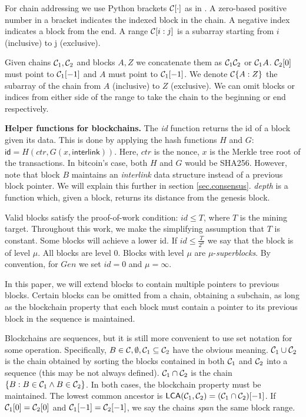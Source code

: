 For chain addressing we use Python brackets $\mathcal{C}[\cdot]$ as in
\cite{fruitchains}. A zero-based positive number in a bracket indicates the
indexed block in the chain. A negative index indicates a block from the end. A
range $\mathcal{C}[i:j]$ is a subarray starting from $i$ (inclusive) to j
(exclusive).

Given chains $\mathcal{C}_1, \mathcal{C}_2$ and blocks $A, Z$ we concatenate them as
$\mathcal{C}_1 \mathcal{C}_2$ or $\mathcal{C}_1 A$. $\mathcal{C}_2[0]$ must point to $\mathcal{C}_1[-1]$
and $A$ must point to $\mathcal{C}_1[-1]$. We denote $\mathcal{C}\{A:Z\}$ the subarray of
the chain from $A$ (inclusive) to $Z$ (exclusive). We can omit blocks or indices
from either side of the range to take the chain to the beginning or end
respectively.

\textbf{Helper functions for blockchains.} The \textit{id} function returns the
id of a block given its data. This is done by applying the hash functions $H$
and $G$: $\textsf{id} = H(ctr, G(x, \textsf{interlink}))$. Here, $ctr$ is the
nonce, $x$ is the Merkle tree root of the transactions. In bitcoin's case, both
$H$ and $G$ would be SHA256.
However, note
that block $B$ maintains an \textit{interlink} data structure instead of a
previous block pointer. We will explain this further in section
\ref{sec.consensus}. \textit{depth} is a function which, given a block, returns
its distance from the genesis block.

Valid blocks satisfy the proof-of-work condition: $id \leq T$, where $T$ is the
mining target. Throughout this work, we make the simplifying assumption that $T$
is constant. Some blocks will achieve a lower id. If $id \leq \frac{T}{2^\mu}$
we say that the block is of level $\mu$. All blocks are level $0$. Blocks with
level $\mu$ are $\mu$-\textit{superblocks}.
By convention, for $Gen$ we set $id = 0$ and $\mu = \infty$.

In this paper, we will extend blocks to contain multiple pointers to previous
blocks. Certain blocks can be omitted from a chain, obtaining a subchain, as
long as the blockchain property that each block must contain a pointer to its
previous block in the sequence is maintained.

Blockchains are sequences, but it is still more convenient to use set notation for some operation. Specifically, $B \in \mathcal{C},
\emptyset, \mathcal{C}_1 \subseteq \mathcal{C}_2$ have the obvious meaning. $\mathcal{C}_1 \cup
\mathcal{C}_2$ is the chain obtained by sorting the blocks contained in both
$\mathcal{C}_1$ and $\mathcal{C}_2$ into a sequence (this may be not always defined).
$\mathcal{C}_1 \cap \mathcal{C}_2$ is the chain
$\{B: B \in \mathcal{C}_1 \land B \in \mathcal{C}_2\}$. In both cases, the blockchain property
must be maintained. The lowest common ancestor is $\textsf{LCA}(\mathcal{C}_1,
\mathcal{C}_2) = (\mathcal{C}_1 \cap \mathcal{C}_2)[-1]$. %
If $\mathcal{C}_1[0] = \mathcal{C}_2[0]$ and
$\mathcal{C}_1[-1] = \mathcal{C}_2[-1]$, we say the chains \textit{span} the same
block range.

